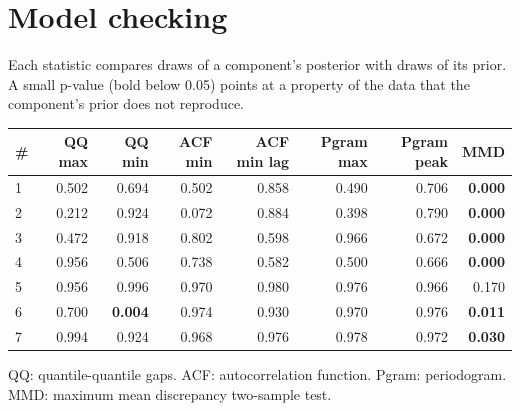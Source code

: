 \documentclass[11pt,a4paper]{article}
\begin{document}
\section*{Model checking}

Each statistic compares draws of a component's posterior with draws of its prior. A small p-value (bold below 0.05) points at a property of the data that the component's prior does not reproduce.

\begin{center}
\begin{tabular}{lrrrrrrr}
\toprule
\# & QQ max & QQ min & ACF min & ACF min lag & Pgram max & Pgram peak & MMD \\
\midrule
1 & 0.502 & 0.694 & 0.502 & 0.858 & 0.490 & 0.706 & \textbf{0.000} \\
2 & 0.212 & 0.924 & 0.072 & 0.884 & 0.398 & 0.790 & \textbf{0.000} \\
3 & 0.472 & 0.918 & 0.802 & 0.598 & 0.966 & 0.672 & \textbf{0.000} \\
4 & 0.956 & 0.506 & 0.738 & 0.582 & 0.500 & 0.666 & \textbf{0.000} \\
5 & 0.956 & 0.996 & 0.970 & 0.980 & 0.976 & 0.966 & 0.170 \\
6 & 0.700 & \textbf{0.004} & 0.974 & 0.930 & 0.970 & 0.976 & \textbf{0.011} \\
7 & 0.994 & 0.924 & 0.968 & 0.976 & 0.978 & 0.972 & \textbf{0.030} \\
\bottomrule
\end{tabular}
\end{center}

QQ: quantile-quantile gaps. ACF: autocorrelation function. Pgram: periodogram. MMD: maximum mean discrepancy two-sample test.
\end{document}
